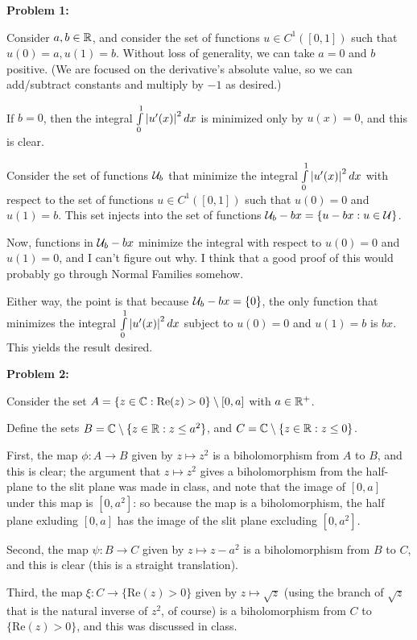 \documentclass[a4paper,12pt]{article}
\begin{document}
{\bf Problem 1:}

Consider $a, b \in \mathbb{R}$, and consider the set of functions $u \in C^1([0,1])$ such that $u(0)=a, u(1)=b$. Without loss of generality, we can take $a=0$ and $b$ positive. (We are focused on the derivative's absolute value, so we can add/subtract constants and multiply by $-1$ as desired.)

If $b=0$, then the integral $\int\limits_0^1 \left\lvert u'(x) \right\rvert^2 dx$ is minimized only by $u(x) =0$, and this is clear.

Consider the set of functions $\mathcal{U}_b$ that minimize the integral $\int\limits_0^1 \left\lvert u'(x) \right\rvert^2 dx$ with respect to the set of functions $u \in C^1([0,1])$ such that $u(0)=0$ and $u(1)=b$. This set injects into the set of functions $\mathcal{U}_b - bx = \{u-bx: u \in \mathcal{U}\}$.

Now, functions in $\mathcal{U}_b -bx$ minimize the integral with respect to $u(0)=0$ and $u(1)=0$, and I can't figure out why. I think that a good proof of this would probably go through Normal Families somehow.

Either way, the point is that because $\mathcal{U}_b -bx = \{0\}$, the only function that minimizes the integral $\int\limits_0^1 \left\lvert u'(x) \right\rvert^2 dx$ subject to $u(0)=0$ and $u(1) = b$ is $bx$. This yields the result desired.

\shunt

{\bf Problem 2:}

Consider the set $A=\{z \in \mathbb{C}: \text{Re}(z) >0\} \setminus [0,a]$ with $a \in \mathbb{R}^+$.

Define the sets $B = \mathbb{C} \setminus \{z \in \mathbb{R}: z \leq a^2\}$, and $C = \mathbb{C} \setminus \{z \in \mathbb{R}: z \leq 0\}$.

First, the map $\phi: A \to B$ given by $z \mapsto z^2$ is a biholomorphism from $A$ to $B$, and this is clear; the argument that $z \mapsto z^2$ gives a biholomorphism from the half-plane to the slit plane was made in class, and note that the image of $[0,a]$ under this map is $[0,a^2]$: so because the map is a biholomorphism, the half plane exluding $[0,a]$ has the image of the slit plane excluding $[0,a^2]$.

Second, the map $\psi: B \to C$ given by $z \mapsto z-a^2$ is a biholomorphism from $B$ to $C$, and this is clear (this is a straight translation).

Third, the map $\xi: C \to \{\text{Re}(z) >0\}$ given by $z \mapsto \sqrt{z}$ (using the branch of $\sqrt{z}$ that is the natural inverse of $z^2$, of course) is a biholomorphism from $C$ to $\{\text{Re}(z) >0\}$, and this was discussed in class.
\end{document}
